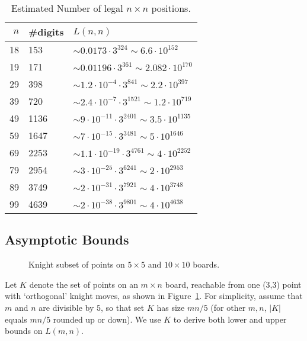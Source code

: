\documentclass{article}
\begin{document}
\begin{table}
\label{samplingcounts}
\begin{center}
\begin{tabular}{|r|l|l|}
\hline
$n$ & \#digits & $L(n,n)$ \\ \hline
18  & 153 & $\sim 0.0173 \cdot 3^{324} \sim 6.6 \cdot 10^{152}$ \\
19  & 171 & $\sim 0.01196 \cdot 3^{361} \sim 2.082 \cdot 10^{170}$ \\
29  & 398 & $\sim 1.2 \cdot 10^{-4} \cdot 3^{841} \sim 2.2 \cdot 10^{397}$ \\
39  & 720 & $\sim 2.4 \cdot 10^{-7} \cdot 3^{1521} \sim 1.2 \cdot 10^{719}$ \\
49  & 1136 & $\sim 9 \cdot 10^{-11} \cdot 3^{2401} \sim 3.5 \cdot 10^{1135}$ \\
59  & 1647 & $\sim 7 \cdot 10^{-15} \cdot 3^{3481} \sim 5 \cdot 10^{1646}$ \\
69  & 2253 & $\sim 1.1 \cdot 10^{-19} \cdot 3^{4761} \sim 4 \cdot 10^{2252}$ \\
79  & 2954 & $\sim 3 \cdot 10^{-25} \cdot 3^{6241} \sim 2 \cdot 10^{2953}$ \\
89  & 3749 & $\sim 2 \cdot 10^{-31} \cdot 3^{7921} \sim 4 \cdot 10^{3748}$ \\
99  & 4639 & $\sim 2 \cdot 10^{-38} \cdot 3^{9801} \sim 4 \cdot 10^{4638}$ \\
\hline
\end{tabular}
\end{center}
\caption{Estimated Number of legal $n\times n$ positions.}
\end{table}

\subsection{Asymptotic Bounds}

\begin{figure}
\begin{center}
\epsfxsize=9cm 
\end{center}
\caption{Knight subset of points on $5 \times 5$ and $10 \times 10$ boards.}
\label{knight}
\end{figure}

Let $K$ denote the set of points on an $m \times n$ board,
reachable from one (3,3) point with `orthogonal'
knight moves, as shown in Figure~\ref{knight}. For simplicity,
assume that $m$ and $n$ are divisible by $5$, so that set $K$ has size $mn/5$
(for other $m,n$, $|K|$ equals $mn/5$ rounded up or down).
We use $K$ to derive both lower and upper bounds on $L(m,n)$.
\end{document}
